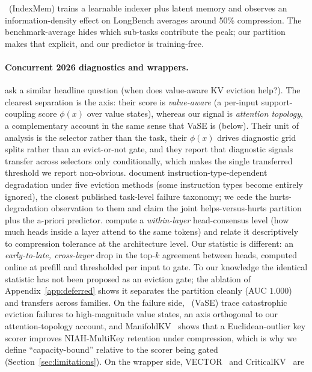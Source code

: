 \documentclass{article}
\begin{document}
\citet{arxiv260525475}~(IndexMem) trains a learnable indexer
plus latent memory and observes an information-density effect on LongBench
averages around 50\% compression. The benchmark-average hides which sub-tasks
contribute the peak; our partition makes that explicit, and our predictor is
training-free.

\paragraph{Concurrent 2026 diagnostics and wrappers.}
\citet{arxiv260508234} ask a similar headline question (when does value-aware
KV eviction help?). The clearest separation is the axis: their score is
\emph{value-aware} (a per-input support-coupling score $\phi(x)$ over value
states), whereas our signal is \emph{attention topology}, a complementary
account in the same sense that VaSE is (below). Their unit of analysis is the
selector rather than the task, their $\phi(x)$ drives diagnostic grid splits
rather than an evict-or-not gate, and they report that diagnostic signals
transfer across selectors only conditionally, which makes the single
transferred threshold we report non-obvious. \citet{arxiv251000231} document
instruction-type-dependent degradation under five eviction methods (some
instruction types become entirely ignored), the closest published task-level
failure taxonomy; we cede the hurts-degradation observation to them and claim
the joint helps-versus-hurts partition plus the a-priori predictor.
\citet{arxiv260301426} compute a \emph{within-layer} head-consensus level (how
much heads inside a layer attend to the same tokens) and relate it descriptively
to compression tolerance at the architecture level. Our statistic is different:
an \emph{early-to-late, cross-layer} drop in the top-$k$ agreement between heads,
computed online at prefill and thresholded per input to gate. To our knowledge
the identical statistic has not been proposed as an eviction gate; the ablation
of Appendix~\ref{app:deferred} shows it separates the partition cleanly (AUC
$1.000$) and transfers across families. On the failure side,
\citet{arxiv260603928}~(VaSE) trace catastrophic eviction failures to
high-magnitude value states, an axis orthogonal to our attention-topology
account, and ManifoldKV~\citep{arxiv260208343} shows that a Euclidean-outlier
key scorer improves NIAH-MultiKey retention under compression, which is why we
define ``capacity-bound'' relative to the scorer being gated
(Section~\ref{sec:limitations}). On the wrapper side,
VECTOR~\citep{arxiv260523258} and CriticalKV~\citep{arxiv250203805} are
\end{document}
